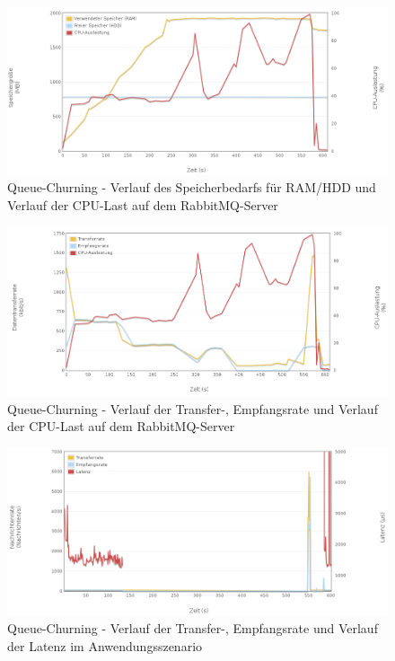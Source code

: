 \documentclass[	a4paper,
			11pt,
			oneside,
			parskip]{scrartcl}
\begin{document}
		\begin{figure}[!htb]
			\centering
			\includegraphics[width=\textwidth]{img/queue/queue_server1.png}
			\caption{Queue-Churning - Verlauf des Speicherbedarfs für RAM/HDD und Verlauf der CPU-Last auf dem RabbitMQ-Server}
			\label{fig:queue-server1}
		\end{figure}
		
		\begin{figure}[!htb]
			\centering
			\includegraphics[width=\textwidth]{img/queue/queue_server2.png}
			\caption{Queue-Churning - Verlauf der Transfer-, Empfangsrate und Verlauf der CPU-Last auf dem RabbitMQ-Server}
			\label{fig:queue-server2}
		\end{figure}
		
		\begin{figure}[!htb]
			\centering
			\includegraphics[width=\textwidth]{img/queue/queue_scenario.png}
			\caption{Queue-Churning - Verlauf der Transfer-, Empfangsrate und Verlauf der Latenz im Anwendungsszenario}
			\label{fig:queue-scenario}
		\end{figure}
	
\end{document}
